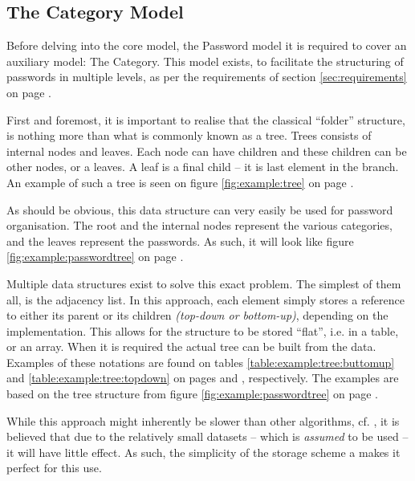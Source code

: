 		\subsection{The Category Model}
			\label{sec:model:category}
			Before delving into the core model, the Password model it is required to cover an auxiliary model: The Category. This model exists, to facilitate the structuring of passwords in multiple levels, as per the requirements of section \ref{sec:requirements} on page \pageref{sec:requirements}.

			First and foremost, it is important to realise that the classical ``folder'' structure, is nothing more than what is commonly known as a tree. Trees consists of internal nodes and leaves. Each node can have children and these children can be other nodes, or a leaves. A leaf is a final child -- it is last element in the branch. An example of such a tree is seen on figure \ref{fig:example:tree} on page \pageref{fig:example:tree}.

			As should be obvious, this data structure can very easily be used for password organisation. The root and the internal nodes represent the various categories, and the leaves represent the passwords. As such, it will look like figure \ref{fig:example:passwordtree} on page \pageref{fig:example:passwordtree}.

			Multiple data structures exist to solve this exact problem. The simplest of them all, is the adjacency list. In this approach, each element simply stores a reference to either its parent or its children \emph{(top-down or bottom-up)}, depending on the implementation. This allows for the structure to be stored ``flat'', i.e. in a table, or an array. When it is required the actual tree can be built from the data. Examples of these notations are found on tables \ref{table:example:tree:buttomup} and \ref{table:example:tree:topdown} on pages \pageref{table:example:tree:buttomup} and \pageref{table:example:tree:topdown}, respectively. The examples are based on the tree structure from figure \ref{fig:example:passwordtree} on page \pageref{fig:example:passwordtree}.

			While this approach might inherently be slower than other algorithms, cf. \cite{heirarchial_database}, it is believed that due to the relatively small datasets -- which is \emph{assumed} to be used -- it will have little effect. As such, the simplicity of the storage scheme a makes it perfect for this use.

